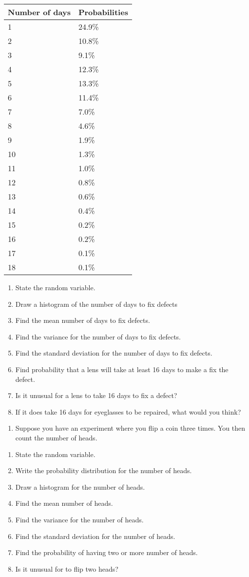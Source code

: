 \documentclass[]{book}
\providecommand{\tightlist}{%
  \setlength{\itemsep}{0pt}\setlength{\parskip}{0pt}}
\begin{document}
\begin{longtable}[]{@{}ll@{}}
\toprule
Number of days & Probabilities\tabularnewline
\midrule
\endhead
1 & 24.9\%\tabularnewline
2 & 10.8\%\tabularnewline
3 & 9.1\%\tabularnewline
4 & 12.3\%\tabularnewline
5 & 13.3\%\tabularnewline
6 & 11.4\%\tabularnewline
7 & 7.0\%\tabularnewline
8 & 4.6\%\tabularnewline
9 & 1.9\%\tabularnewline
10 & 1.3\%\tabularnewline
11 & 1.0\%\tabularnewline
12 & 0.8\%\tabularnewline
13 & 0.6\%\tabularnewline
14 & 0.4\%\tabularnewline
15 & 0.2\%\tabularnewline
16 & 0.2\%\tabularnewline
17 & 0.1\%\tabularnewline
18 & 0.1\%\tabularnewline
\bottomrule
\end{longtable}

\begin{enumerate}
\def\labelenumi{\alph{enumi}.}
\item
  State the random variable.
\item
  Draw a histogram of the number of days to fix defects
\item
  Find the mean number of days to fix defects.
\item
  Find the variance for the number of days to fix defects.
\item
  Find the standard deviation for the number of days to fix defects.
\item
  Find probability that a lens will take at least 16 days to make a
  fix the defect.
\item
  Is it unusual for a lens to take 16 days to fix a defect?
\item
  If it does take 16 days for eyeglasses to be repaired, what would
  you think?
\end{enumerate}

\begin{enumerate}
\def\labelenumi{\arabic{enumi}.}
\setcounter{enumi}{1}
\tightlist
\item
  Suppose you have an experiment where you flip a coin three times.
  You then count the number of heads.
\end{enumerate}

\begin{enumerate}
\def\labelenumi{\alph{enumi}.}
\item
  State the random variable.
\item
  Write the probability distribution for the number of heads.
\item
  Draw a histogram for the number of heads.
\item
  Find the mean number of heads.
\item
  Find the variance for the number of heads.
\item
  Find the standard deviation for the number of heads.
\item
  Find the probability of having two or more number of heads.
\item
  Is it unusual for to flip two heads?
\end{enumerate}
\end{document}
